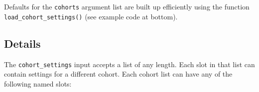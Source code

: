 \documentclass[
]{book}
\newenvironment{Shaded}{\begin{snugshade}}{\end{snugshade}}
\newcommand{\DecValTok}[1]{\textcolor[rgb]{0.00,0.00,0.81}{#1}}
\newcommand{\NormalTok}[1]{#1}
\newcommand{\OperatorTok}[1]{\textcolor[rgb]{0.81,0.36,0.00}{\textbf{#1}}}
\newcommand{\OtherTok}[1]{\textcolor[rgb]{0.56,0.35,0.01}{#1}}
\newcommand{\StringTok}[1]{\textcolor[rgb]{0.31,0.60,0.02}{#1}}
\begin{document}
\begin{Shaded}
\end{Shaded}

Defaults for the \texttt{cohorts} argument list are built up efficiently using the function \texttt{load\_cohort\_settings()} (see example code at bottom).

\hypertarget{details-1}{%
\subsection*{Details}\label{details-1}}

The \texttt{cohort\_settings} input accepts a list of any length. Each slot in that list can contain settings for a different cohort. Each cohort list can have any of the following named slots:
\end{document}
